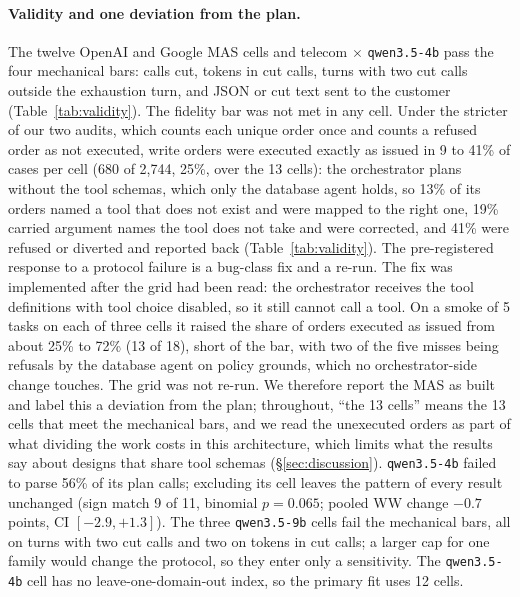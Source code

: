 \paragraph{Validity and one deviation from the plan.} The twelve OpenAI and Google MAS cells and telecom $\times$ \texttt{qwen3.5-4b} pass the four mechanical bars: calls cut, tokens in cut calls, turns with two cut calls outside the exhaustion turn, and JSON or cut text sent to the customer (Table~\ref{tab:validity}). The fidelity bar was not met in any cell. Under the stricter of our two audits, which counts each unique order once and counts a refused order as not executed, write orders were executed exactly as issued in 9 to 41\% of cases per cell (680 of 2,744, 25\%, over the 13 cells): the orchestrator plans without the tool schemas, which only the database agent holds, so 13\% of its orders named a tool that does not exist and were mapped to the right one, 19\% carried argument names the tool does not take and were corrected, and 41\% were refused or diverted and reported back (Table~\ref{tab:validity}). The pre-registered response to a protocol failure is a bug-class fix and a re-run. The fix was implemented after the grid had been read: the orchestrator receives the tool definitions with tool choice disabled, so it still cannot call a tool. On a smoke of 5 tasks on each of three cells it raised the share of orders executed as issued from about 25\% to 72\% (13 of 18), short of the bar, with two of the five misses being refusals by the database agent on policy grounds, which no orchestrator-side change touches. The grid was not re-run. We therefore report the MAS as built and label this a deviation from the plan; throughout, ``the 13 cells'' means the 13 cells that meet the mechanical bars, and we read the unexecuted orders as part of what dividing the work costs in this architecture, which limits what the results say about designs that share tool schemas (\S\ref{sec:discussion}). \texttt{qwen3.5-4b} failed to parse 56\% of its plan calls; excluding its cell leaves the pattern of every result unchanged (sign match 9 of 11, binomial $p = 0.065$; pooled WW change $-0.7$ points, CI $[-2.9, +1.3]$). The three \texttt{qwen3.5-9b} cells fail the mechanical bars, all on turns with two cut calls and two on tokens in cut calls; a larger cap for one family would change the protocol, so they enter only a sensitivity. The \texttt{qwen3.5-4b} cell has no leave-one-domain-out index, so the primary fit uses 12 cells.

